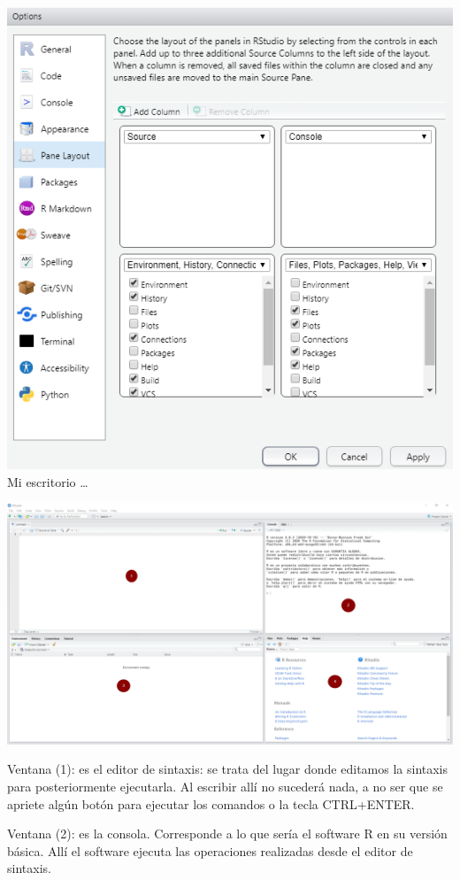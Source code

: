 \documentclass[
]{book}
\begin{document}
\includegraphics{data/RS01.png} Mi escritorio \ldots{}

\includegraphics{data/RS03.png}

Ventana (1): es el editor de sintaxis: se trata del lugar donde editamos la sintaxis para posteriormente ejecutarla. Al escribir allí no sucederá nada, a no ser que se apriete algún botón para ejecutar los comandos o la tecla CTRL+ENTER.

Ventana (2): es la consola. Corresponde a lo que sería el software R en su versión básica. Allí el software ejecuta las operaciones realizadas desde el editor de sintaxis.
\end{document}
